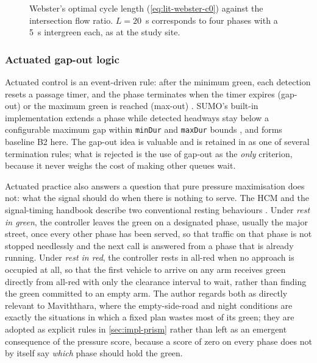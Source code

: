 \begin{figure}[htbp]
  \centering
  \caption{Webster's optimal cycle length (\cref{eq:lit-webster-c0}) against the intersection flow ratio.
  $L=20$~s corresponds to four phases with a 5~s intergreen each, as at the study site.}
  \label{fig:lit-webster}
\end{figure}

\subsubsection{Actuated gap-out logic}
Actuated control is an event-driven rule: after the minimum green, each detection resets a passage timer, and
the phase terminates when the timer expires (gap-out) or the maximum green is reached (max-out)
\cite{koonce2008timing}. SUMO's built-in implementation extends a phase while detected headways stay below a
configurable maximum gap within \texttt{minDur} and \texttt{maxDur} bounds \cite{sumo_actuated}, and forms
baseline B2 here. The gap-out idea is valuable and is retained in \prism{} as one of several termination rules;
what is rejected is the use of gap-out as the \emph{only} criterion, because it never weighs the cost of making
other queues wait.

Actuated practice also answers a question that pure pressure maximisation does not: what the signal should do
when there is nothing to serve. The HCM and the signal-timing handbook describe two conventional resting
behaviours \cite{hcm2016,koonce2008timing}. Under \emph{rest in green}, the controller leaves the green on a
designated phase, usually the major street, once every other phase has been served, so that traffic on that
phase is not stopped needlessly and the next call is answered from a phase that is already running. Under
\emph{rest in red}, the controller rests in all-red when no approach is occupied at all, so that the first
vehicle to arrive on any arm receives green directly from all-red with only the clearance interval to wait,
rather than finding the green committed to an empty arm. The author regards both as directly relevant to
Maviththara, where the empty-side-road and night conditions are exactly the situations in which a fixed plan
wastes most of its green; they are adopted as explicit rules in \cref{sec:impl-prism} rather than left as an
emergent consequence of the pressure score, because a score of zero on every phase does not by itself say
\emph{which} phase should hold the green.

